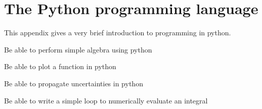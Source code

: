 \chapter{The Python programming language}
\label{app:python}
This appendix gives a very brief introduction to programming in python. 
 \vspace{1cm}
\begin{learningObjectives}
\item Be able to perform simple algebra using python
\item Be able to plot a function in python
\item Be able to propagate uncertainties in python
\item Be able to write a simple loop to numerically evaluate an integral
\end{learningObjectives}


